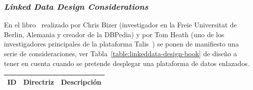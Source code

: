 \subsubsection{\textit{Linked Data Design Considerations}}\label{linked-data-design-issues}
En el libro~\cite{Heath_Bizer_2011} realizado por Chris Bizer (investigador en la Freie Universitat de Berlin, Alemania y creador de la DBPedia) y 
por Tom Heath (uno de los investigadores principales de la plataforma Talis~\cite{talis}) se ponen de manifiesto una serie de consideraciones, ver Tabla~\ref{table:linkeddata-design-book}
de diseño a tener en cuenta cuando se pretende desplegar una plataforma de datos enlazados. 


\begin{longtable}[c]{|l|p{6.5cm}|p{7.5cm}|} 

\hline

  \textbf{ID} & \textbf{Directriz} &  \textbf{Descripción} \\\hline


\end{longtable}
